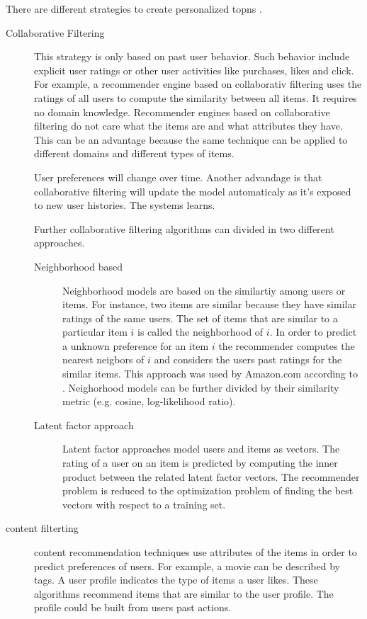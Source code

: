 There are different strategies to create personalized \glspl{topn} \cite{jannach11}. 
\begin{description}
\item[Collaborative Filtering] This strategy is only based on past user behavior. Such behavior include explicit user ratings or other user activities like purchases, likes and click. For example, a recommender engine based on collaborativ filtering uses the ratings of all users to compute the similarity between all items. 
It requires no domain knowledge. Recommender engines based on collaborative filtering do not care what the items are and what attributes they have. This can be an advantage because the same technique can be applied to different domains and different types of items. 

User preferences will change over time. Another advandage is that collaborative filtering will update the model automaticaly as it's exposed to new user histories. The systems learns.

Further collaborative filtering algorithms can divided in two different approaches.
\begin{description}
\item[Neighborhood based] Neighborhood models are based on the similartiy among users or items. For instance, two items are similar because they have similar ratings of the same users. The set of items that are similar to a particular item $i$ is called the neighborhood of $i$. In order to predict a unknown preference for an item $i$ the recommender computes the nearest neigbors of $i$ and considers the users past ratings for the similar items. This approach was used by Amazon.com according to \cite{Linden}. Neighorhood models can be further divided by their similarity metric (e.g. cosine, log-likelihood ratio).
\item[Latent factor approach] Latent factor approaches model users and items as vectors. The rating of a user on an item is predicted by computing the inner product between the related latent factor vectors. The recommender problem is reduced to the optimization problem of finding the best vectors with respect to a training set.
\end{description}
\item[\gls{content} filterting] \gls{content} recommendation techniques use attributes of the items in order to predict preferences of users. For example, a movie can be described by \glspl{tag}. A user profile indicates the type of items a user likes. These algorithms recommend items that are similar to the user profile. The profile could be built from users past actions.
\end{description}

